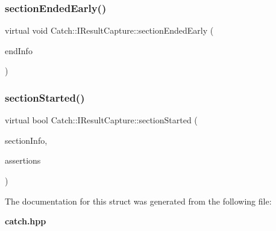\mbox{\label{struct_catch_1_1_i_result_capture_afcc71eef8ca821ae132cced4a2be6988}} 
\subsubsection{section\+Ended\+Early()}
{\footnotesize\ttfamily virtual void Catch\+::\+I\+Result\+Capture\+::section\+Ended\+Early (\begin{DoxyParamCaption}\item[{\textbf{ Section\+End\+Info} const \&}]{end\+Info }\end{DoxyParamCaption})\hspace{0.3cm}{\ttfamily [pure virtual]}}

\mbox{\label{struct_catch_1_1_i_result_capture_a5b76ed52badcb64cf374202e12b81a03}} 
\subsubsection{section\+Started()}
{\footnotesize\ttfamily virtual bool Catch\+::\+I\+Result\+Capture\+::section\+Started (\begin{DoxyParamCaption}\item[{\textbf{ Section\+Info} const \&}]{section\+Info,  }\item[{\textbf{ Counts} \&}]{assertions }\end{DoxyParamCaption})\hspace{0.3cm}{\ttfamily [pure virtual]}}



The documentation for this struct was generated from the following file\+:\begin{DoxyCompactItemize}
\item 
\textbf{ catch.\+hpp}\end{DoxyCompactItemize}
